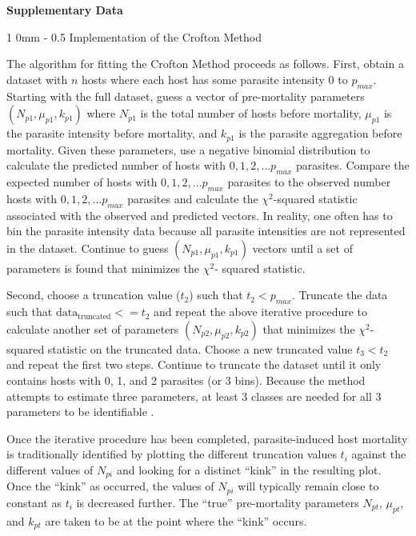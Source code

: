 \documentclass[12pt, a4paper]{article}
\makeatletter
\renewcommand{\section}{\@startsection
{section}%
{1}%
{0mm}%
{-\baselineskip}%
{0.5\baselineskip}%
{\normalfont\bf\large}} %
\makeatother
\begin{document}
\linenumbers

\doublespacing

\noindent
\Large{\textbf{Supplementary Data}}

\normalsize

\section{Implementation of the Crofton Method}

The algorithm for fitting the Crofton Method \citep{Crofton1971a} proceeds as follows. First, obtain a dataset
with $n$ hosts where each host has some parasite intensity 0 to $p_{max}$. Starting
with the full dataset, guess a vector of pre-mortality parameters $(N_{p1}, \mu_{p1}, k_{p1})$ where $N_{p1}$ is the total number of hosts before mortality, $\mu_{p1}$ is the parasite intensity before mortality, and $k_{p1}$ is the parasite aggregation before mortality. Given
these parameters, use a negative binomial distribution to calculate the predicted number of hosts with $0, 1, 2, \dots
p_{max}$ parasites.  Compare the expected number of hosts with $0, 1, 2, \dots  p_{max}$ parasites
to the observed number hosts with $0, 1, 2, \dots p_{max}$ parasites and calculate
the $\chi^2$-squared statistic associated with the observed and predicted vectors. In reality, one often has to bin the parasite intensity data because all
parasite intensities are not represented in the dataset. Continue to guess $(N_{p1},
\mu_{p1}, k_{p1})$ vectors until a set of parameters is found that minimizes the $\chi^2$-
squared statistic.

Second, choose a truncation value ($t_2$) such that $t_2 <
p_{max}$. Truncate the data such that $\text{data}_\text{truncated} <= t_2$ and repeat the above
iterative procedure to calculate another set of parameters $(N_{p2}, \mu_{p2}, k_{p2})$
that minimizes the $\chi^2$-squared statistic on the truncated data. Choose a new
truncated value $t_3 < t_2$ and repeat the first two steps. Continue to truncate
the dataset until it only contains hosts with 0, 1, and 2 parasites (or 3 bins).
Because the method attempts to estimate three parameters, at least 3 classes are
needed for all 3 parameters to be identifiable \citep{Royce1990}.


Once the iterative procedure has been completed, parasite-induced host mortality is traditionally identified by plotting the different truncation values $t_{i}$ against the different values of $N_{pi}$ and looking for a distinct ``kink'' in the resulting plot.   Once the ``kink'' as occurred, the values of $N_{pi}$ will typically remain close to constant as $t_i$ is decreased further.  The ``true'' pre-mortality parameters $N_{pt}$, $\mu_{pt}$, and $k_{pt}$ are taken to be at the point where the ``kink'' occurs.
\end{document}
